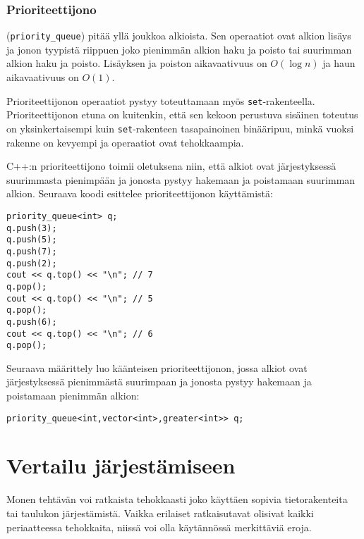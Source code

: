 \subsubsection{Prioriteettijono}


 (\texttt{priority\_queue})
pitää yllä joukkoa alkioista.
Sen operaatiot ovat alkion lisäys ja
jonon tyypistä riippuen joko
pienimmän alkion haku ja poisto tai
suurimman alkion haku ja poisto.
Lisäyksen ja poiston aikavaativuus on $O(\log n)$
ja haun aikavaativuus on $O(1)$.

Prioriteettijonon operaatiot
pystyy toteuttamaan myös \texttt{set}-rakenteella.
Prioriteettijonon etuna on kuitenkin,
että sen kekoon perustuva sisäinen
toteutus on yksinkertaisempi
kuin \texttt{set}-rakenteen tasapainoinen binääripuu,
minkä vuoksi rakenne on kevyempi ja
operaatiot ovat tehokkaampia.

\begin{samepage}
C++:n prioriteettijono toimii oletuksena niin,
että alkiot ovat järjestyksessä suurimmasta pienimpään
ja jonosta pystyy hakemaan ja poistamaan suurimman alkion.
Seuraava koodi esittelee prioriteettijonon käyttämistä:

\begin{lstlisting}
priority_queue<int> q;
q.push(3);
q.push(5);
q.push(7);
q.push(2);
cout << q.top() << "\n"; // 7
q.pop();
cout << q.top() << "\n"; // 5
q.pop();
q.push(6);
cout << q.top() << "\n"; // 6
q.pop();
\end{lstlisting}
\end{samepage}

Seuraava määrittely luo käänteisen prioriteettijonon,
jossa alkiot ovat järjestyksessä pienimmästä suurimpaan
ja jonosta pystyy hakemaan ja poistamaan pienimmän alkion:

\begin{lstlisting}
priority_queue<int,vector<int>,greater<int>> q;
\end{lstlisting}

\section{Vertailu järjestämiseen}

Monen tehtävän voi ratkaista tehokkaasti joko
käyttäen sopivia tietorakenteita
tai taulukon järjestämistä.
Vaikka erilaiset ratkaisutavat olisivat kaikki
periaatteessa tehokkaita, niissä voi olla
käytännössä merkittäviä eroja.

